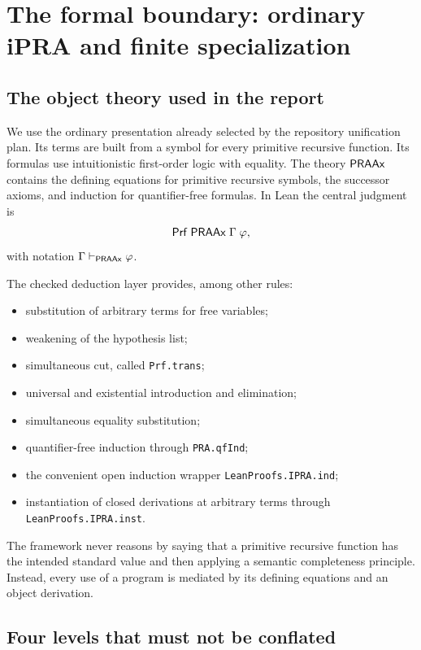 \section{The formal boundary: ordinary iPRA and finite specialization}
\label{sec:boundary}

\subsection{The object theory used in the report}

We use the ordinary presentation already selected by the repository
unification plan.  Its terms are built from a symbol for every primitive
recursive function.  Its formulas use intuitionistic first-order logic with
equality.  The theory \(\mathsf{PRAAx}\) contains the defining equations for primitive
recursive symbols, the successor axioms, and induction for quantifier-free
formulas.  In Lean the central judgment is
\[
       \mathsf{Prf}\;\mathsf{PRAAx}\;\Gamma\;\varphi,
\]
with notation \(\Gamma\vdash_{\mathsf{PRAAx}}\varphi\).

The checked deduction layer provides, among other rules:

\begin{itemize}
\item substitution of arbitrary terms for free variables;
\item weakening of the hypothesis list;
\item simultaneous cut, called \texttt{Prf.trans};
\item universal and existential introduction and elimination;
\item simultaneous equality substitution;
\item quantifier-free induction through \texttt{PRA.qfInd};
\item the convenient open induction wrapper \texttt{LeanProofs.IPRA.ind};
\item instantiation of closed derivations at arbitrary terms through
      \texttt{LeanProofs.IPRA.inst}.
\end{itemize}

The framework never reasons by saying that a primitive recursive function has
the intended standard value and then applying a semantic completeness
principle.  Instead, every use of a program is mediated by its defining
equations and an object derivation.

\subsection{Four levels that must not be conflated}

